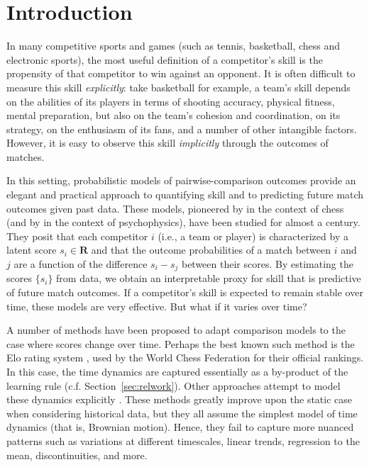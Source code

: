 \section{Introduction}
\label{sec:intro}

In many competitive sports and games (such as tennis, basketball, chess and electronic sports), the most useful definition of a competitor's skill is the propensity of that competitor to win against an opponent.
It is often difficult to measure this skill \emph{explicitly}:
take basketball for example, a team's skill depends on the abilities of its players in terms of shooting accuracy, physical fitness, mental preparation, but also on the team's cohesion and coordination, on its strategy, on the enthusiasm of its fans, and a number of other intangible factors.
However, it is easy to observe this skill \emph{implicitly} through the outcomes of matches.

In this setting, probabilistic models of pairwise-comparison outcomes provide an elegant and practical approach to quantifying skill and to predicting future match outcomes given past data.
These models, pioneered by \citet{zermelo1928berechnung} in the context of chess (and by \citet{thurstone1927law} in the context of psychophysics), have been studied for almost a century.
They posit that each competitor $i$ (i.e., a team or player) is characterized by a latent score $s_i \in \mathbf{R}$ and that the outcome probabilities of a match between $i$ and $j$ are a function of the difference $s_i - s_j$ between their scores.
By estimating the scores $\{ s_i \}$ from data, we obtain an interpretable proxy for skill that is predictive of future match outcomes.
If a competitor's skill is expected to remain stable over time, these models are very effective.
But what if it varies over time?

A number of methods have been proposed to adapt comparison models to the case where scores change over time.
Perhaps the best known such method is the Elo rating system \citep{elo1978rating}, used by the World Chess Federation for their official rankings.
In this case, the time dynamics are captured essentially as a by-product of the learning rule (c.f. Section~\ref{sec:relwork}).
Other approaches attempt to model these dynamics explicitly \citep[e.g.,][]{fahrmeir1994dynamic, glickman1999parameter, dangauthier2007trueskill, coulom2008whole}.
These methods greatly improve upon the static case when considering historical data, but they all assume the simplest model of time dynamics (that is, Brownian motion).
Hence, they fail to capture more nuanced patterns such as variations at different timescales, linear trends, regression to the mean, discontinuities, and more.

